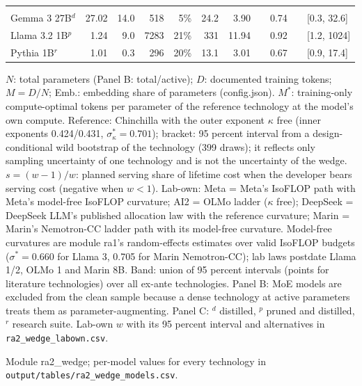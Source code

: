 \begin{table}[tp]
{\begin{tabular}{@{}lrrrrrrlrcl@{}}
\addlinespace
\multicolumn{11}{@{}l}{\textit{Panel C. Other excluded models (for reference)}} \\[1pt]
Gemma 3 27B$^d$ & 27.02 & 14.0 & 518 & 5\% & 24.2 & 3.90 & & 0.74 & & {\scriptsize[0.3, 32.6]} \\
Llama 3.2 1B$^p$ & 1.24 & 9.0 & 7283 & 21\% & 331 & 11.94 & & 0.92 & & {\scriptsize[1.2, 1024]} \\
Pythia 1B$^r$ & 1.01 & 0.3 & 296 & 20\% & 13.1 & 3.01 & & 0.67 & & {\scriptsize[0.9, 17.4]} \\
\bottomrule
\end{tabular}%
}
\ifdim\wd\ratabbox>\textwidth\resizebox{\textwidth}{!}{\usebox{\ratabbox}}\else\usebox{\ratabbox}\fi\par
\begin{tablenotes}$N$: total parameters (Panel B: total/active); $D$: documented training tokens; $M=D/N$; Emb.: embedding share of parameters (config.json). $M^*$: training-only compute-optimal tokens per parameter of the reference technology at the model's own compute. Reference: Chinchilla with the outer exponent $\kappa$ free (inner exponents 0.424/0.431, $\sigma^*_\kappa=0.701$); bracket: 95 percent interval from a design-conditional wild bootstrap of the technology (399 draws); it reflects only sampling uncertainty of one technology and is not the uncertainty of the wedge. $s=(w-1)/w$: planned serving share of lifetime cost when the developer bears serving cost (negative when $w<1$). Lab-own: Meta = Meta's IsoFLOP path with Meta's model-free IsoFLOP curvature; AI2 = OLMo ladder ($\kappa$ free); DeepSeek = DeepSeek LLM's published allocation law with the reference curvature; Marin = Marin's Nemotron-CC ladder path with its model-free curvature. Model-free curvatures are module ra1's random-effects estimates over valid IsoFLOP budgets ($\sigma^*=0.660$ for Llama 3, 0.705 for Marin Nemotron-CC); lab laws postdate Llama 1/2, OLMo 1 and Marin 8B. Band: union of 95 percent intervals (points for literature technologies) over all ex-ante technologies. Panel B: MoE models are excluded from the clean sample because a dense technology at active parameters treats them as parameter-augmenting. Panel C: $^d$ distilled, $^p$ pruned and distilled, $^r$ research suite. Lab-own $w$ with its 95 percent interval and alternatives in \texttt{ra2\_wedge\_labown.csv}.\end{tablenotes}
\begin{tablenotes}[Source]Module ra2\_wedge; per-model values for every technology in \texttt{output/tables/ra2\_wedge\_models.csv}.\end{tablenotes}
\end{table}
